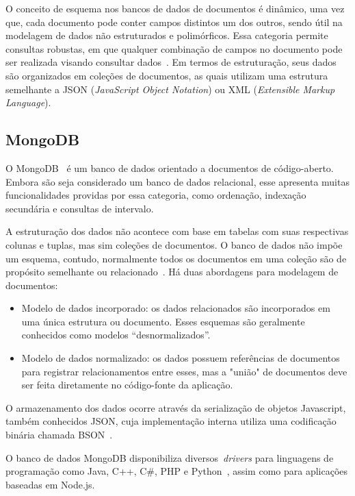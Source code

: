 \documentclass[12pt]{article}
\begin{document}
O conceito de esquema nos bancos de dados de documentos é dinâmico, uma vez que, cada documento pode conter campos distintos um dos outros, sendo útil na modelagem de dados não estruturados e polimórficos. 
Essa categoria permite consultas robustas, em que qualquer combinação de campos no documento pode ser realizada visando consultar dados~\cite{patil:2017}.
Em termos de estruturação, seus dados são organizados em coleções de documentos, as quais utilizam uma estrutura semelhante a JSON (\emph{JavaScript Object Notation}) ou XML (\emph{Extensible Markup Language}). 

\subsection{MongoDB}

O MongoDB~\cite{membrey2011definitive} é um banco de dados orientado a documentos de código-aberto. Embora são seja considerado um banco de dados relacional, esse apresenta muitas funcionalidades providas por essa categoria, como ordenação, indexação secundária e consultas de intervalo.

A estruturação dos dados não acontece com base em tabelas com suas respectivas colunas e tuplas, mas sim coleções de documentos.
O banco de dados não impõe um esquema, contudo, normalmente todos os documentos em uma coleção são de propósito semelhante ou relacionado~\cite{kanade2014study,lutu2015big}. Há duas abordagens para modelagem de documentos: 

\begin{itemize}
\item Modelo de dados incorporado: os dados relacionados são incorporados em uma única estrutura ou documento. Esses esquemas são geralmente conhecidos como modelos “desnormalizados”.
\item Modelo de dados normalizado: os dados possuem referências de documentos para registrar relacionamentos entre esses, mas a "união" de documentos deve ser feita diretamente no código-fonte da aplicação.
\end{itemize}

O armazenamento dos dados ocorre através da serialização de objetos Javascript, também conhecidos JSON, cuja implementação interna utiliza uma codificação binária chamada BSON~\cite{bson}.

O banco de dados MongoDB disponibiliza diversos~\emph{drivers} para linguagens de programação como Java, C++, C\#, PHP e Python~\cite{lutu2015big}, assim como para aplicações baseadas em Node.js.
\end{document}
